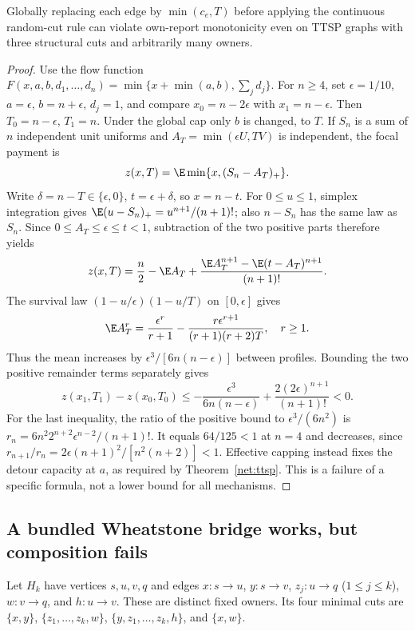 \begin{proposition}
\label{net:global-cap}
Globally replacing each edge by $\min(c_e,T)$ before applying the continuous
random-cut rule can violate own-report monotonicity even on TTSP graphs
with three structural cuts and arbitrarily many owners.
\end{proposition}
\begin{proof}
Use the flow function
$F(x,a,b,d_1,\ldots,d_n)=\min\{x+\min(a,b),\sum_jd_j\}$.
For $n\ge4$, set $\epsilon=1/10$, $a=\epsilon$, $b=n+\epsilon$,
$d_j=1$, and compare $x_0=n-2\epsilon$ with $x_1=n-\epsilon$.
Then $T_0=n-\epsilon$, $T_1=n$.  Under the global cap only $b$ is changed,
to $T$.  If $S_n$ is a sum of $n$ independent unit uniforms and
$A_T=\min(\epsilon U,TV)$ is independent, the focal payment is
\[
 z(x,T)=\E\min\{x,(S_n-A_T)_+\}.
\]
Write $\delta=n-T\in\{\epsilon,0\}$, $t=\epsilon+\delta$, so $x=n-t$.
For $0\le u\le1$, simplex integration gives
$\E(u-S_n)_+=u^{n+1}/(n+1)!$; also $n-S_n$ has the same law as $S_n$.
Since $0\le A_T\le\epsilon\le t<1$, subtraction of the two positive parts
therefore yields
\[
 z(x,T)=\frac n2-\E A_T+
 \frac{\E A_T^{n+1}-\E(t-A_T)^{n+1}}{(n+1)!}.
\]
The survival law $(1-u/\epsilon)(1-u/T)$ on $[0,\epsilon]$ gives
\[
 \E A_T^r=\frac{\epsilon^r}{r+1}
 -\frac{r\epsilon^{r+1}}{(r+1)(r+2)T},\quad r\ge1.
\]
Thus the mean increases by $\epsilon^3/[6n(n-\epsilon)]$ between profiles.
Bounding the two positive remainder terms separately gives
\[
 z(x_1,T_1)-z(x_0,T_0)
 \le-\frac{\epsilon^3}{6n(n-\epsilon)}
       +\frac{2(2\epsilon)^{n+1}}{(n+1)!}<0.
\]
For the last inequality, the ratio of the positive bound to
$\epsilon^3/(6n^2)$ is
$r_n=6n^2 2^{n+2}\epsilon^{n-2}/(n+1)!$.
It equals $64/125<1$ at $n=4$ and decreases, since
$r_{n+1}/r_n=2\epsilon(n+1)^2/[n^2(n+2)]<1$.
Effective capping instead fixes the detour capacity at $a$, as required by
Theorem~\ref{net:ttsp}.  This is a failure of a specific formula, not a
lower bound for all mechanisms.
\end{proof}

\subsection{A bundled Wheatstone bridge works, but composition fails}
Let $H_k$ have vertices $s,u,v,q$ and edges
$x:s\to u$, $y:s\to v$, $z_j:u\to q$ ($1\le j\le k$),
$w:v\to q$, and $h:u\to v$.  These are distinct fixed owners.
Its four minimal cuts are
$\{x,y\}$, $\{z_1,\ldots,z_k,w\}$,
$\{y,z_1,\ldots,z_k,h\}$, and $\{x,w\}$.

